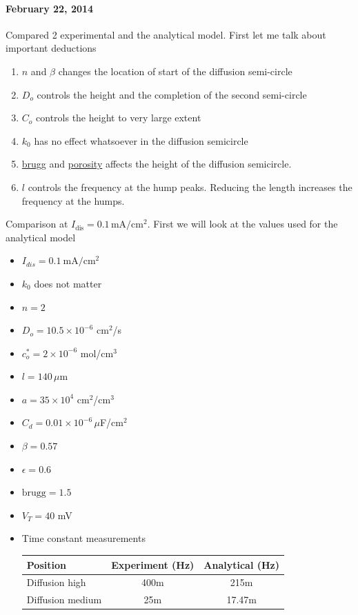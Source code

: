 \documentclass[12pt]{book}
\begin{document}
\paragraph*{February 22, 2014}
Compared 2 experimental and the analytical model.
First let me talk about important deductions
\begin{enumerate}
\item $n$ and $\beta$ changes the location of start of the diffusion semi-circle
\item $D_o$ controls the height and the completion of the second semi-circle
\item $C_o$ controls the height to very large extent
\item $k_0$ has no effect whatsoever in the diffusion semicircle
\item \underline{brugg} and \underline{porosity} affects the height of the diffusion semicircle.
\item $l$ controls the frequency at the hump peaks. Reducing the length increases the frequency at the humps. 
\end{enumerate} 
Comparison at $I_{\textrm{dis}}=0.1\,\textrm{mA}/\textrm{cm}^2$. First we will look at the values used for the analytical model
\begin{itemize}
\item $I_{dis}=\SI{0.1}{\milli\ampere\per\centi\meter\squared}$
\item $k_0$ does not matter
\item $n=2$
\item $D_o=10.5\times 10^{-6}$ cm$^2$/s
\item $c_o^*=2\times 10^{-6}$ mol/cm$^3$
\item $l=140\,\mu$m
\item $a=35\times 10^{4}$ cm$^2$/cm$^3$
\item $C_d=0.01\times 10^{-6}\,\mu$F/cm$^2$ 
\item $\beta=0.57$
\item $\epsilon=0.6$
\item $\textrm{brugg}=1.5$
\item $V_T=40$ mV
\item Time constant measurements

\begin{tabular}{ |l|| c| c| }
 \hline
 Position & Experiment (Hz) & Analytical (Hz)\\\hline
Diffusion high & 400m &	215m \\\cline{2-3}
Diffusion medium & 25m & 	17.47m  \\
  \hline
\end{tabular}
\end{itemize}
\end{document}
